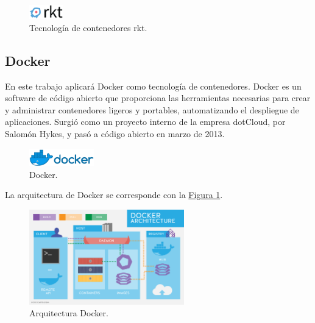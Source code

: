 \begin{figure}[H]
\centering
\includegraphics[width=0.13\textwidth]{images/figures/rkt.png}
\caption{Tecnología de contenedores rkt.\footnotemark}
\end{figure}


\subsection{Docker}\label{docker}

En este trabajo aplicará Docker como tecnología de contenedores. Docker es un software de código abierto que proporciona las herramientas necesarias para crear y administrar contenedores ligeros y portables, automatizando el despliegue de aplicaciones. Surgió como un proyecto interno de la empresa dotCloud, por Salomón Hykes, y pasó a código abierto en marzo de 2013.

\begin{figure}[H]
\centering
\includegraphics[width=0.25\textwidth]{images/figures/docker.png}
\caption{Docker.\footnotemark}
\end{figure}


La arquitectura de Docker se corresponde con la \hyperref[fig:docker]{Figura \ref{fig:docker}}. 

\begin{figure}[H]
\centering
\includegraphics[width=0.6\textwidth]{images/figures/dockerarchitecture.png}
\caption{Arquitectura Docker.\footnotemark \label{fig:docker}}
\end{figure}

